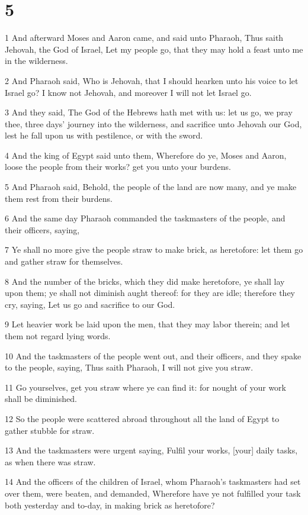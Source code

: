 \chapter{5}

\par 1 And afterward Moses and Aaron came, and said unto Pharaoh, Thus saith Jehovah, the God of Israel, Let my people go, that they may hold a feast unto me in the wilderness.
\par 2 And Pharaoh said, Who is Jehovah, that I should hearken unto his voice to let Israel go? I know not Jehovah, and moreover I will not let Israel go.
\par 3 And they said, The God of the Hebrews hath met with us: let us go, we pray thee, three days' journey into the wilderness, and sacrifice unto Jehovah our God, lest he fall upon us with pestilence, or with the sword.
\par 4 And the king of Egypt said unto them, Wherefore do ye, Moses and Aaron, loose the people from their works? get you unto your burdens.
\par 5 And Pharaoh said, Behold, the people of the land are now many, and ye make them rest from their burdens.
\par 6 And the same day Pharaoh commanded the taskmasters of the people, and their officers, saying,
\par 7 Ye shall no more give the people straw to make brick, as heretofore: let them go and gather straw for themselves.
\par 8 And the number of the bricks, which they did make heretofore, ye shall lay upon them; ye shall not diminish aught thereof: for they are idle; therefore they cry, saying, Let us go and sacrifice to our God.
\par 9 Let heavier work be laid upon the men, that they may labor therein; and let them not regard lying words.
\par 10 And the taskmasters of the people went out, and their officers, and they spake to the people, saying, Thus saith Pharaoh, I will not give you straw.
\par 11 Go yourselves, get you straw where ye can find it: for nought of your work shall be diminished.
\par 12 So the people were scattered abroad throughout all the land of Egypt to gather stubble for straw.
\par 13 And the taskmasters were urgent saying, Fulfil your works, [your] daily tasks, as when there was straw.
\par 14 And the officers of the children of Israel, whom Pharaoh's taskmasters had set over them, were beaten, and demanded, Wherefore have ye not fulfilled your task both yesterday and to-day, in making brick as heretofore?
